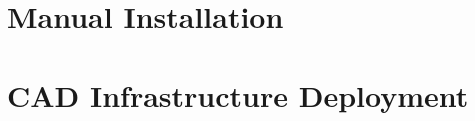 \documentclass[a4paper,12pt,twoside]{ThesisStyle}
\begin{document}
















\backmatter


\begin{appendices}
\renewcommand{\thesection}{\Alph{section}}

\section{Manual Installation}
\label{appendix:appendix_a}

\newpage


\section{CAD Infrastructure Deployment}
\label{appendix:appendix_b}

\end{appendices}




\end{document}
